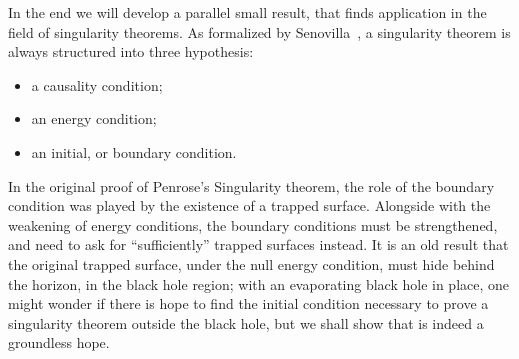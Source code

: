 In the end we will develop a parallel small result, that finds application in the field of singularity theorems. As formalized by Senovilla~\cite[]{senovilla1998singularity}, a singularity theorem is always structured into three hypothesis:
\begin{itemize}
    \item[\ding{99}] a causality condition; 
    \item[\ding{99}] an energy condition;
    \item[\ding{99}] an initial, or boundary condition.
\end{itemize}
In the original proof of Penrose's Singularity theorem, the role of the boundary condition was played by the existence of a trapped surface. Alongside with the weakening of energy conditions, the boundary conditions must be strengthened, and need to ask for ``sufficiently'' trapped surfaces instead. It is an old result that the original trapped surface, under the null energy condition, must hide behind the horizon, in the black hole region; with an evaporating black hole in place, one might wonder if there is hope to find the initial condition necessary to prove a singularity theorem outside the black hole, but we shall show that is indeed a groundless hope.